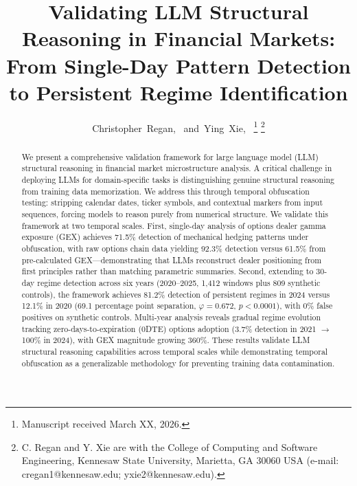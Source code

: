\documentclass[journal]{IEEEtran}
\begin{document}
\title{Validating LLM Structural Reasoning in Financial Markets: From Single-Day Pattern Detection to Persistent Regime Identification}

\author{Christopher~Regan,~\IEEEmembership{}
        and~Ying~Xie,~
\thanks{Manuscript received March XX, 2026.}
\thanks{C. Regan and Y. Xie are with the College of Computing and Software Engineering, Kennesaw State University, Marietta, GA 30060 USA (e-mail: cregan1@kennesaw.edu; yxie2@kennesaw.edu).}}


\maketitle

\begin{abstract}
We present a comprehensive validation framework for large language model (LLM) structural reasoning in financial market microstructure analysis. A critical challenge in deploying LLMs for domain-specific tasks is distinguishing genuine structural reasoning from training data memorization. We address this through temporal obfuscation testing: stripping calendar dates, ticker symbols, and contextual markers from input sequences, forcing models to reason purely from numerical structure. We validate this framework at two temporal scales. First, single-day analysis of options dealer gamma exposure (GEX) achieves 71.5\% detection of mechanical hedging patterns under obfuscation, with raw options chain data yielding 92.3\% detection versus 61.5\% from pre-calculated GEX---demonstrating that LLMs reconstruct dealer positioning from first principles rather than matching parametric summaries. Second, extending to 30-day regime detection across six years (2020--2025, 1,412 windows plus 809 synthetic controls), the framework achieves 81.2\% detection of persistent regimes in 2024 versus 12.1\% in 2020 (69.1 percentage point separation, $\varphi = 0.672$, $p < 0.0001$), with 0\% false positives on synthetic controls. Multi-year analysis reveals gradual regime evolution tracking zero-days-to-expiration (0DTE) options adoption (3.7\% detection in 2021 $\rightarrow$ 100\% in 2024), with GEX magnitude growing 360\%. These results validate LLM structural reasoning capabilities across temporal scales while demonstrating temporal obfuscation as a generalizable methodology for preventing training data contamination.
\end{abstract}
\end{document}
